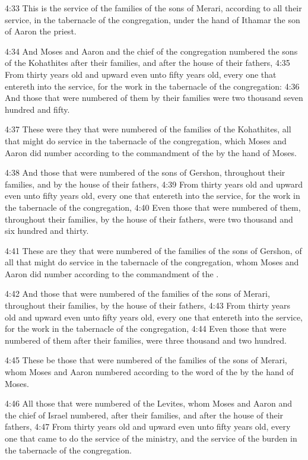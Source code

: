 4:33 This is the service of the families of the sons of Merari, according to all their service, in the tabernacle of the congregation, under the hand of Ithamar the son of Aaron the priest.

4:34 And Moses and Aaron and the chief of the congregation numbered the sons of the Kohathites after their families, and after the house of their fathers, 4:35 From thirty years old and upward even unto fifty years old, every one that entereth into the service, for the work in the tabernacle of the congregation: 4:36 And those that were numbered of them by their families were two thousand seven hundred and fifty.

4:37 These were they that were numbered of the families of the Kohathites, all that might do service in the tabernacle of the congregation, which Moses and Aaron did number according to the commandment of the \LORD by the hand of Moses.

4:38 And those that were numbered of the sons of Gershon, throughout their families, and by the house of their fathers, 4:39 From thirty years old and upward even unto fifty years old, every one that entereth into the service, for the work in the tabernacle of the congregation, 4:40 Even those that were numbered of them, throughout their families, by the house of their fathers, were two thousand and six hundred and thirty.

4:41 These are they that were numbered of the families of the sons of Gershon, of all that might do service in the tabernacle of the congregation, whom Moses and Aaron did number according to the commandment of the \LORD.

4:42 And those that were numbered of the families of the sons of Merari, throughout their families, by the house of their fathers, 4:43 From thirty years old and upward even unto fifty years old, every one that entereth into the service, for the work in the tabernacle of the congregation, 4:44 Even those that were numbered of them after their families, were three thousand and two hundred.

4:45 These be those that were numbered of the families of the sons of Merari, whom Moses and Aaron numbered according to the word of the \LORD by the hand of Moses.

4:46 All those that were numbered of the Levites, whom Moses and Aaron and the chief of Israel numbered, after their families, and after the house of their fathers, 4:47 From thirty years old and upward even unto fifty years old, every one that came to do the service of the ministry, and the service of the burden in the tabernacle of the congregation.

